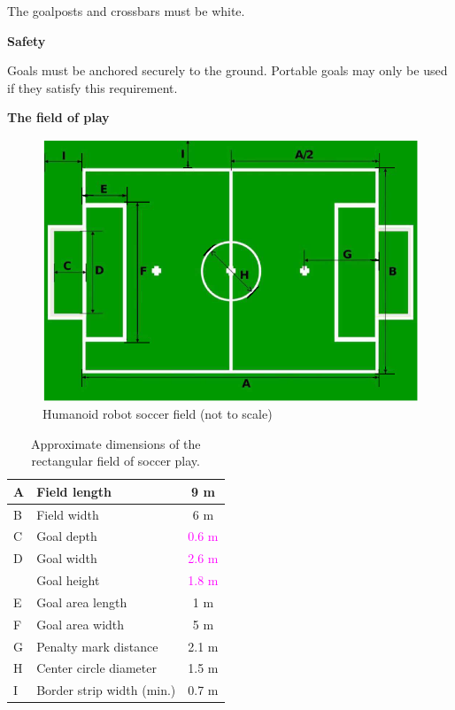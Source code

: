 \bigskip

The goalposts and crossbars must be white.

\bigskip

{\bfseries Safety}

\headlinebox

Goals must be anchored securely to the ground. Portable goals may only be used if they satisfy this requirement.

\bigskip

{\bfseries The field of play}

\headlinebox 

\begin{center}
\begin{figure}[h]
\includegraphics[width=\textwidth]{img/field.png}
\caption{Humanoid robot soccer field (not to scale)}
\end{figure}
\end{center}
\newpage

\begin{center}
\tablehead{}
\begin{table}[h]
\caption{Approximate dimensions of the rectangular field of soccer play.}
\centering
\begin{tabular}{|l|l|c|}
\hline
A & Field length & 9 m\\
\hline
B & Field width &  6 m\\
\hline
C & Goal depth & \textcolor{magenta}{0.6 m}\\
\hline
D & Goal width & \textcolor{magenta}{2.6 m}\\
\hline
~ & Goal height & \textcolor{magenta}{1.8 m}\\
\hline
E & Goal area length & 1 m\\
\hline
F & Goal area width & 5 m\\
\hline
G & Penalty mark distance & 2.1 m\\
\hline
H & Center circle diameter & 1.5 m\\
\hline
I & Border strip width (min.) & 0.7 m\\
\hline
\end{tabular}
\end{table}
\end{center}

